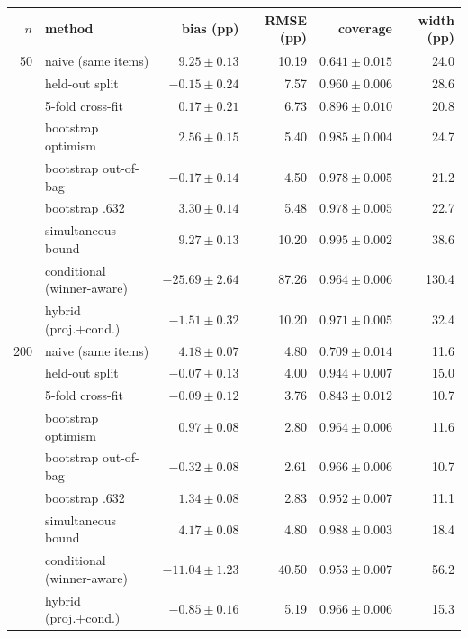 {\footnotesize\setlength{\tabcolsep}{3.5pt}
\begin{tabular}{rlrrrr}
\toprule
$n$ & method & bias (pp) & RMSE (pp) & coverage & width (pp) \\
\midrule
50 & naive (same items) & $9.25 \pm 0.13$ & 10.19 & $0.641 \pm 0.015$ & 24.0 \\
 & held-out split & $-0.15 \pm 0.24$ & 7.57 & $0.960 \pm 0.006$ & 28.6 \\
 & 5-fold cross-fit & $0.17 \pm 0.21$ & 6.73 & $0.896 \pm 0.010$ & 20.8 \\
 & bootstrap optimism & $2.56 \pm 0.15$ & 5.40 & $0.985 \pm 0.004$ & 24.7 \\
 & bootstrap out-of-bag & $-0.17 \pm 0.14$ & 4.50 & $0.978 \pm 0.005$ & 21.2 \\
 & bootstrap .632 & $3.30 \pm 0.14$ & 5.48 & $0.978 \pm 0.005$ & 22.7 \\
 & simultaneous bound & $9.27 \pm 0.13$ & 10.20 & $0.995 \pm 0.002$ & 38.6 \\
 & conditional (winner-aware) & $-25.69 \pm 2.64$ & 87.26 & $0.964 \pm 0.006$ & 130.4 \\
 & hybrid (proj.+cond.) & $-1.51 \pm 0.32$ & 10.20 & $0.971 \pm 0.005$ & 32.4 \\
\midrule
200 & naive (same items) & $4.18 \pm 0.07$ & 4.80 & $0.709 \pm 0.014$ & 11.6 \\
 & held-out split & $-0.07 \pm 0.13$ & 4.00 & $0.944 \pm 0.007$ & 15.0 \\
 & 5-fold cross-fit & $-0.09 \pm 0.12$ & 3.76 & $0.843 \pm 0.012$ & 10.7 \\
 & bootstrap optimism & $0.97 \pm 0.08$ & 2.80 & $0.964 \pm 0.006$ & 11.6 \\
 & bootstrap out-of-bag & $-0.32 \pm 0.08$ & 2.61 & $0.966 \pm 0.006$ & 10.7 \\
 & bootstrap .632 & $1.34 \pm 0.08$ & 2.83 & $0.952 \pm 0.007$ & 11.1 \\
 & simultaneous bound & $4.17 \pm 0.08$ & 4.80 & $0.988 \pm 0.003$ & 18.4 \\
 & conditional (winner-aware) & $-11.04 \pm 1.23$ & 40.50 & $0.953 \pm 0.007$ & 56.2 \\
 & hybrid (proj.+cond.) & $-0.85 \pm 0.16$ & 5.19 & $0.966 \pm 0.006$ & 15.3 \\
\bottomrule
\end{tabular}}
